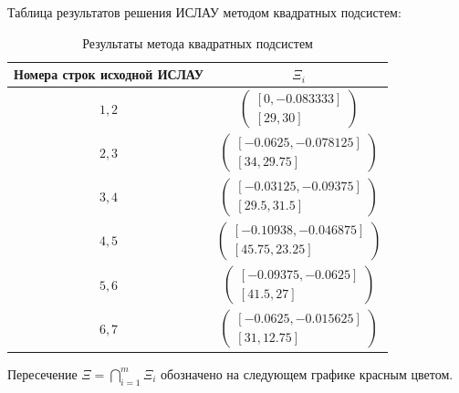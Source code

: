 \documentclass[a4paper]{article}
\begin{document}
Таблица результатов решения ИСЛАУ методом квадратных подсистем:
\begin{table}[H]
    \centering
\begin{tabular}{|c|c|}
    \hline
     Номера строк исходной ИСЛАУ& $\Xi_i$ \\
     \hline
     $1,2$&$\begin{pmatrix}[0,-0.083333] \\ [29,30]\end{pmatrix}$\\
     \hline
     $2,3$&$\begin{pmatrix}[-0.0625,-0.078125] \\ [34,29.75]\end{pmatrix}$\\
     \hline
     $3,4$&$\begin{pmatrix}[-0.03125,-0.09375] \\ [29.5,31.5]\end{pmatrix}$\\
     \hline
     $4,5$&$\begin{pmatrix}[-0.10938,-0.046875] \\ [45.75,23.25]\end{pmatrix}$\\
     \hline
     $5,6$&$\begin{pmatrix}[-0.09375,-0.0625] \\ [41.5,27]\end{pmatrix}$\\
     \hline
     $6,7$&$\begin{pmatrix}[-0.0625,-0.015625] \\ [31,12.75]\end{pmatrix}$\\
     \hline
\end{tabular}
\caption{Результаты метода квадратных подсистем}
\label{tab:xi}
\end{table}
Пересечение $\Xi=\bigcap_{i=1}^m\Xi_i$ обозначено на следующем графике красным цветом.
\end{document}
